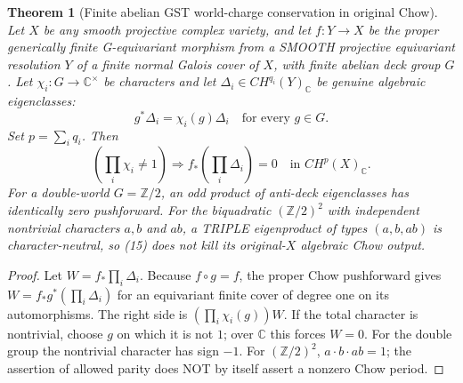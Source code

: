 \documentclass[11pt]{article}
\newtheorem{theorem}{Theorem}
\begin{document}
\begin{theorem}[Finite abelian GST world-charge conservation in original Chow]
Let $X$ be any smooth projective complex variety,
and let $f:Y\to X$ be the proper generically
finite G-equivariant morphism from a SMOOTH
projective equivariant resolution $Y$ of
a finite normal Galois cover of $X$,
with finite abelian deck group $G$.
Let $\chi_i:G\to\mathbb C^\times$ be characters
and let $\Delta_i\in CH^{q_i}(Y)_{\mathbb C}$
be genuine algebraic eigenclasses:
\[
 g^*\Delta_i=\chi_i(g)\Delta_i
       \quad\text{for every }g\in G.
\]
Set $p=\sum_i q_i$. Then
\[
 \boxed{
  \left(\prod_i\chi_i\ne1\right)
  \Longrightarrow
  f_*\!\left(\prod_i\Delta_i\right)=0
       \quad\text{in }CH^p(X)_{\mathbb C}.}  \tag{15}
\]
For a double-world $G=\mathbb Z/2$,
an odd product of anti-deck eigenclasses
has identically zero pushforward.
For the biquadratic $(\mathbb Z/2)^2$
with independent nontrivial characters
$a,b$ and $ab$, a TRIPLE eigenproduct of
types $(a,b,ab)$ is character-neutral,
so (15) does not kill its original-$X$
algebraic Chow output.
\end{theorem}
\begin{proof}
Let $W=f_*\prod_i\Delta_i$.
Because $f\circ g=f$, the proper Chow
pushforward gives
$W=f_*g^*(\prod_i\Delta_i)$
for an equivariant finite cover of
degree one on its automorphisms.
The right side is
$(\prod_i\chi_i(g))W$.
If the total character is nontrivial,
choose $g$ on which it is not $1$;
over $\mathbb C$ this forces $W=0$.
For the double group the nontrivial
character has sign $-1$.
For $(\mathbb Z/2)^2$, $a\cdot b\cdot ab=1$;
the assertion of allowed parity does NOT
by itself assert a nonzero Chow period.
\end{proof}
\end{document}
